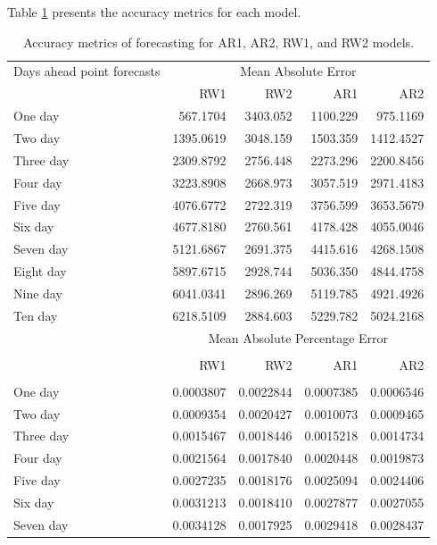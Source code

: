 \documentclass[10pt,letterpaper]{article}
\begin{document}
Table \ref{tab:Accuracy} presents the accuracy metrics for each model. 

\begin{table}[!h]
	
	\caption{\label{tab:Accuracy}Accuracy metrics of forecasting for AR1, AR2, RW1, and RW2 models.}
	\centering
	\begin{tabular}[t]{lrrrr}
		\hline
		Days ahead point forecasts & \multicolumn{4}{c}{Mean Absolute Error}\\
		\cline{2-5}
		& RW1 & RW2 & AR1 & AR2\\
		\hline
	One day & 567.1704 & 3403.052 & 1100.229 & 975.1169\\
	\hline
	Two day & 1395.0619 & 3048.159 & 1503.359 & 1412.4527\\
	\hline
	Three day & 2309.8792 & 2756.448 & 2273.296 & 2200.8456\\
	\hline
	Four day & 3223.8908 & 2668.973 & 3057.519 & 2971.4183\\
	\hline
	Five day & 4076.6772 & 2722.319 & 3756.599 & 3653.5679\\
	\hline
	Six day & 4677.8180 & 2760.561 & 4178.428 & 4055.0046\\
	\hline
	Seven day & 5121.6867 & 2691.375 & 4415.616 & 4268.1508\\
	\hline
	Eight day & 5897.6715 & 2928.744 & 5036.350 & 4844.4758\\
	\hline
	Nine day & 6041.0341 & 2896.269 & 5119.785 & 4921.4926\\
	\hline
	Ten day & 6218.5109 & 2884.603 & 5229.782 & 5024.2168\\
	\hline
		& \multicolumn{4}{c}{Mean Absolute Percentage Error}\\
		\cline{2-5}\\
		& RW1 & RW2 & AR1 & AR2\\
		\hline\\
	One day & 0.0003807 & 0.0022844 & 0.0007385 & 0.0006546\\
	\hline
	Two day & 0.0009354 & 0.0020427 & 0.0010073 & 0.0009465\\
	\hline
	Three day & 0.0015467 & 0.0018446 & 0.0015218 & 0.0014734\\
	\hline
	Four day & 0.0021564 & 0.0017840 & 0.0020448 & 0.0019873\\
	\hline
	Five day & 0.0027235 & 0.0018176 & 0.0025094 & 0.0024406\\
	\hline
	Six day & 0.0031213 & 0.0018410 & 0.0027877 & 0.0027055\\
	\hline
	Seven day & 0.0034128 & 0.0017925 & 0.0029418 & 0.0028437\\

\end{tabular}
\end{table}
\end{document}
